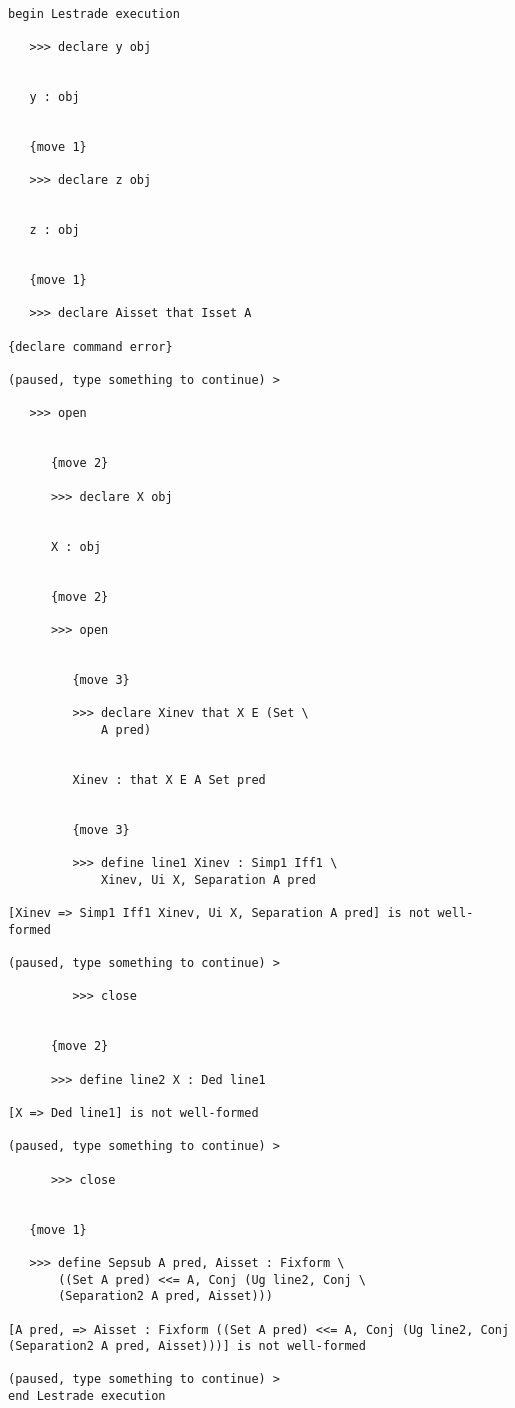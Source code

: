\documentclass[12pt]{article}
\begin{document}
\begin{verbatim}

begin Lestrade execution

   >>> declare y obj


   y : obj


   {move 1}

   >>> declare z obj


   z : obj


   {move 1}

   >>> declare Aisset that Isset A

{declare command error}

(paused, type something to continue) >

   >>> open


      {move 2}

      >>> declare X obj


      X : obj


      {move 2}

      >>> open


         {move 3}

         >>> declare Xinev that X E (Set \
             A pred)


         Xinev : that X E A Set pred


         {move 3}

         >>> define line1 Xinev : Simp1 Iff1 \
             Xinev, Ui X, Separation A pred

[Xinev => Simp1 Iff1 Xinev, Ui X, Separation A pred] is not well-formed

(paused, type something to continue) >

         >>> close


      {move 2}

      >>> define line2 X : Ded line1

[X => Ded line1] is not well-formed

(paused, type something to continue) >

      >>> close


   {move 1}

   >>> define Sepsub A pred, Aisset : Fixform \
       ((Set A pred) <<= A, Conj (Ug line2, Conj \
       (Separation2 A pred, Aisset)))

[A pred, => Aisset : Fixform ((Set A pred) <<= A, Conj (Ug line2, Conj (Separation2 A pred, Aisset)))] is not well-formed

(paused, type something to continue) >
end Lestrade execution
\end{verbatim}
\end{document}
